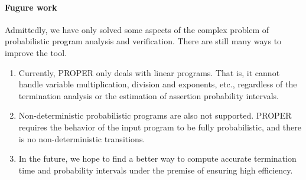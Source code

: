 \documentclass[runningheads]{llncs}
\begin{document}
\paragraph{Fugure work}
Admittedly, we have only solved some aspects of the complex problem of probabilistic program analysis and verification. There are still many ways to improve the tool.
\begin{enumerate}
	\item Currently, PROPER only deals with linear programs. That is, it cannot handle variable multiplication, division and exponents, etc., regardless of the termination analysis or the estimation of assertion probability intervals.
	\item Non-deterministic probabilistic programs  are also not supported. PROPER requires the behavior of the input program to be fully probabilistic, and there is no non-deterministic transitions. 
	\item In the future, we hope to find a better way to compute accurate termination time and probability intervals under the premise of ensuring high efficiency. 
\end{enumerate}
\end{document}
